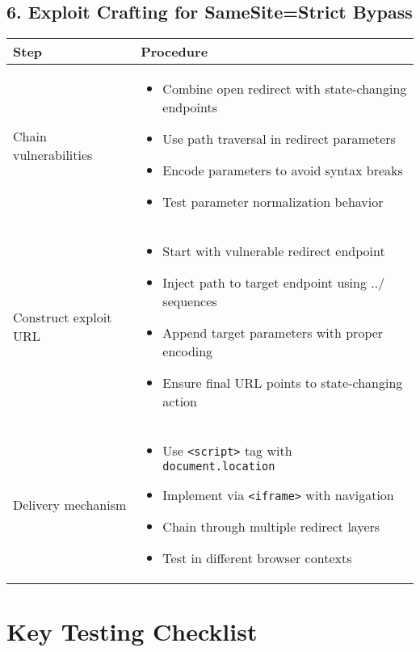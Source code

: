 \documentclass{article}
\begin{document}
\subsection*{6. Exploit Crafting for SameSite=Strict Bypass}
\begin{tabular}{>{\raggedright\arraybackslash}p{}>{\raggedright\arraybackslash}p{}}
    \toprule
    \textbf{Step} & \textbf{Procedure} \\
    \midrule
    Chain vulnerabilities & 
    \begin{itemize}
        \setlength\itemsep{0em}
        \item Combine open redirect with state-changing endpoints
        \item Use path traversal in redirect parameters
        \item Encode parameters to avoid syntax breaks
        \item Test parameter normalization behavior
    \end{itemize} \\
    Construct exploit URL & 
    \begin{itemize}
        \setlength\itemsep{0em}
        \item Start with vulnerable redirect endpoint
        \item Inject path to target endpoint using ../ sequences
        \item Append target parameters with proper encoding
        \item Ensure final URL points to state-changing action
    \end{itemize} \\
    Delivery mechanism & 
    \begin{itemize}
        \setlength\itemsep{0em}
        \item Use \texttt{<script>} tag with \texttt{document.location}
        \item Implement via \texttt{<iframe>} with navigation
        \item Chain through multiple redirect layers
        \item Test in different browser contexts
    \end{itemize} \\
    \bottomrule
\end{tabular}

\section*{Key Testing Checklist}
\end{document}

